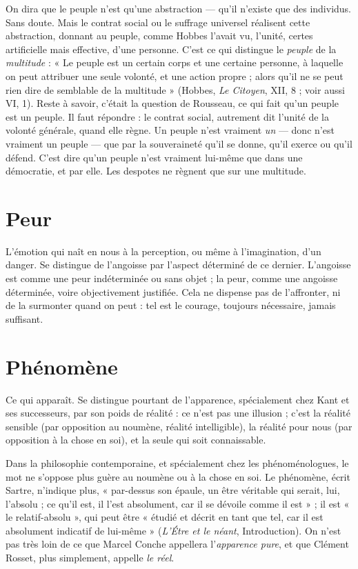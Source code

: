 On dira que le peuple n’est qu’une abstraction — qu’il n’existe que des individus.
Sans doute. Mais le contrat social ou le suffrage universel réalisent cette
abstraction, donnant au peuple, comme Hobbes l'avait vu, l'unité, certes artificielle
mais effective, d’une personne. C’est ce qui distingue le {\it peuple} de la
{\it multitude} : « Le peuple est un certain corps et une certaine personne, à laquelle
on peut attribuer une seule volonté, et une action propre ; alors qu’il ne se peut
rien dire de semblable de la multitude » (Hobbes, {\it Le Citoyen}, XII, 8 ; voir aussi
VI, 1). Reste à savoir, c'était la question de Rousseau, ce qui fait qu’un peuple
est un peuple. Il faut répondre : le contrat social, autrement dit l’unité de la
volonté générale, quand elle règne. Un peuple n’est vraiment {\it un} — donc n’est
vraiment un peuple — que par la souveraineté qu’il se donne, qu’il exerce ou
qu’il défend. C’est dire qu’un peuple n’est vraiment lui-même que dans une
démocratie, et par elle. Les despotes ne règnent que sur une multitude.

\section{Peur}
L’émotion qui naît en nous à la perception, ou même à l’imagination,
d’un danger. Se distingue de l’angoisse par l’aspect déterminé
de ce dernier. L’angoisse est comme une peur indéterminée ou sans objet ; la
peur, comme une angoisse déterminée, voire objectivement justifiée. Cela ne
dispense pas de l’affronter, ni de la surmonter quand on peut : tel est le courage,
toujours nécessaire, jamais suffisant.

\section{Phénomène}
Ce qui apparaît. Se distingue pourtant de l'apparence, spécialement
chez Kant et ses successeurs, par son poids de
réalité : ce n’est pas une illusion ; c’est la réalité sensible (par opposition au
noumène, réalité intelligible), la réalité pour nous (par opposition à la chose en
soi), et la seule qui soit connaissable.

Dans la philosophie contemporaine, et spécialement chez les phénoménologues,
le mot ne s’oppose plus guère au noumène ou à la chose en soi. Le phénomène,
écrit Sartre, n'indique plus, « par-dessus son épaule, un être véritable
qui serait, lui, l’absolu ; ce qu’il est, il l’est absolument, car il se dévoile comme
il est » ; il est « le relatif-absolu », qui peut être « étudié et décrit en tant que tel,
car il est absolument indicatif de lui-même » ({\it L'Étre et le néant}, Introduction).
On n’est pas très loin de ce que Marcel Conche appellera l'{\it apparence pure}, et
que Clément Rosset, plus simplement, appelle {\it le réel}.

